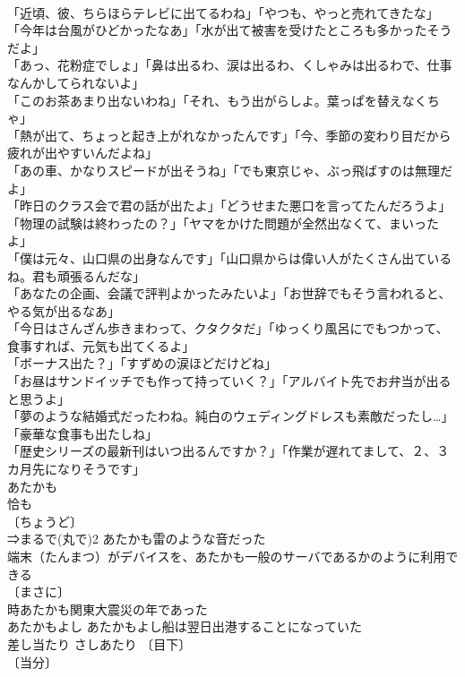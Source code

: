 \documentclass[8pt]{extreport}
\begin{document}
\begin{CJK}{UTF8}{min}
\\	「近頃、彼、ちらほらテレビに出てるわね」「やつも、やっと売れてきたな」 
\\	「今年は台風がひどかったなあ」「水が出て被害を受けたところも多かったそうだよ」 
\\	「あっ、花粉症でしょ」「鼻は出るわ、涙は出るわ、くしゃみは出るわで、仕事なんかしてられないよ」 
\\	「このお茶あまり出ないわね」「それ、もう出がらしよ。葉っぱを替えなくちゃ」 
\\	「熱が出て、ちょっと起き上がれなかったんです」「今、季節の変わり目だから疲れが出やすいんだよね」 
\\	「あの車、かなりスピードが出そうね」「でも東京じゃ、ぶっ飛ばすのは無理だよ」 
\\	「昨日のクラス会で君の話が出たよ」「どうせまた悪口を言ってたんだろうよ」 
\\	「物理の試験は終わったの？」「ヤマをかけた問題が全然出なくて、まいったよ」 
\\	「僕は元々、山口県の出身なんです」「山口県からは偉い人がたくさん出ているね。君も頑張るんだな」 
\\	「あなたの企画、会議で評判よかったみたいよ」「お世辞でもそう言われると、やる気が出るなあ」 
\\	「今日はさんざん歩きまわって、クタクタだ」「ゆっくり風呂にでもつかって、食事すれば、元気も出てくるよ」 
\\	「ボーナス出た？」「すずめの涙ほどだけどね」 
\\	「お昼はサンドイッチでも作って持っていく？」「アルバイト先でお弁当が出ると思うよ」 
\\	「夢のような結婚式だったわね。純白のウェディングドレスも素敵だったし…」「豪華な食事も出たしね」 
\\	「歴史シリーズの最新刊はいつ出るんですか？」「作業が遅れてまして、２、３カ月先になりそうです」 
\\	あたかも	
\\	恰も	
\\	〔ちょうど〕
\\	⇒まるで(丸で)2 あたかも雷のような音だった 
\\	端末（たんまつ）がデバイスを、あたかも一般のサーバであるかのように利用できる 
\\	〔まさに〕
\\	時あたかも関東大震災の年であった 
\\	あたかもよし あたかもよし船は翌日出港することになっていた 
\\	差し当たり	さしあたり	〔目下〕
\\	〔当分〕

\end{CJK}
\end{document}
